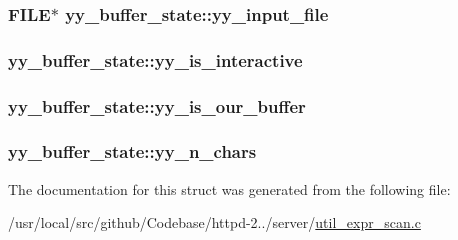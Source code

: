 \subsubsection[{\texorpdfstring{yy\+\_\+input\+\_\+file}{yy_input_file}}]{\setlength{\rightskip}{0pt plus 5cm}F\+I\+LE$\ast$ yy\+\_\+buffer\+\_\+state\+::yy\+\_\+input\+\_\+file}\hypertarget{structyy__buffer__state_a4843d1422e3276b636d475a3095bd948}{}\label{structyy__buffer__state_a4843d1422e3276b636d475a3095bd948}
\subsubsection[{\texorpdfstring{yy\+\_\+is\+\_\+interactive}{yy_is_interactive}}]{ yy\+\_\+buffer\+\_\+state\+::yy\+\_\+is\+\_\+interactive}\hypertarget{structyy__buffer__state_abf5c70eea75581b58c0ee7bd31b14490}{}\label{structyy__buffer__state_abf5c70eea75581b58c0ee7bd31b14490}
\subsubsection[{\texorpdfstring{yy\+\_\+is\+\_\+our\+\_\+buffer}{yy_is_our_buffer}}]{ yy\+\_\+buffer\+\_\+state\+::yy\+\_\+is\+\_\+our\+\_\+buffer}\hypertarget{structyy__buffer__state_a80ce2431c70dc4f89ced487f18449465}{}\label{structyy__buffer__state_a80ce2431c70dc4f89ced487f18449465}
\subsubsection[{\texorpdfstring{yy\+\_\+n\+\_\+chars}{yy_n_chars}}]{ yy\+\_\+buffer\+\_\+state\+::yy\+\_\+n\+\_\+chars}\hypertarget{structyy__buffer__state_a06406208824817acfec2183b79080945}{}\label{structyy__buffer__state_a06406208824817acfec2183b79080945}


The documentation for this struct was generated from the following file\+:\begin{DoxyCompactItemize}
\item 
/usr/local/src/github/\+Codebase/httpd-\/2../server/\hyperlink{util__expr__scan_8c}{util\+\_\+expr\+\_\+scan.\+c}\end{DoxyCompactItemize}
